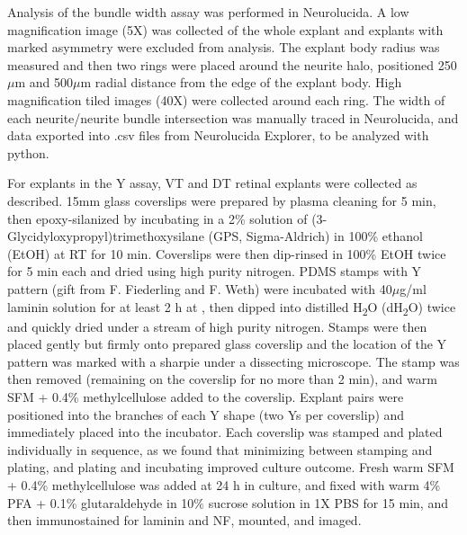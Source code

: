 Analysis of the bundle width assay was performed in Neurolucida.
A low magnification image (5X) was collected of the whole explant and explants with marked asymmetry were excluded from analysis.
The explant body radius was measured and then two rings were placed around the neurite halo, positioned 250$\mu$m and 500$\mu$m radial distance from the edge of the explant body.
High magnification tiled images (40X) were collected around each ring.
The width of each neurite/neurite bundle intersection was manually traced in Neurolucida, and data exported into .csv files from Neurolucida Explorer, to be analyzed with python.

For explants in the Y assay, VT and DT retinal explants were collected as described.
15mm glass coverslips were prepared by plasma cleaning for 5 min, then epoxy-silanized by incubating in a 2\% solution of (3-Glycidyloxypropyl)trimethoxysilane (GPS, Sigma-Aldrich) in 100\% ethanol (EtOH) at RT for 10 min.
Coverslips were then dip-rinsed in 100\% EtOH twice for 5 min each and dried using high purity nitrogen.
PDMS stamps with Y pattern (gift from F. Fiederling and F. Weth) were incubated with 40$\mu$g/ml laminin solution for at least 2 h at , then dipped into distilled H\textsubscript{2}O (dH\textsubscript{2}O) twice and quickly dried under a stream of high purity nitrogen.
Stamps were then placed gently but firmly onto prepared glass coverslip and the location of the Y pattern was marked with a sharpie under a dissecting microscope.
The stamp was then removed (remaining on the coverslip for no more than 2 min), and warm SFM + 0.4\% methylcellulose added to the coverslip.
Explant pairs were positioned into the branches of each Y shape (two Ys per coverslip) and immediately placed into the incubator.
Each coverslip was stamped and plated individually in sequence, as we found that minimizing between stamping and plating, and plating and incubating improved culture outcome.
Fresh warm SFM + 0.4\% methylcellulose was added at 24 h in culture, and fixed with warm 4\% PFA + 0.1\% glutaraldehyde in 10\% sucrose solution in 1X PBS for 15 min, and then immunostained for laminin and NF, mounted, and imaged.